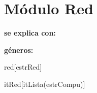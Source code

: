 \section{M\'odulo Red}

\begin{Interfaz}
  
  \textbf{se explica con:} 

  \textbf{g\'eneros:} 
  
\end{Interfaz}

\begin{Representacion}

  \begin{Estructura}{red}[estrRed]

    \begin{Tupla}[estrRed]
    \end{Tupla}

    \begin{Tupla}[estrCompu]
    \end{Tupla}

  \end{Estructura}

  \begin{Estructura}{itRed}[itLista(estrCompu)]
  \end{Estructura}

\end{Representacion}